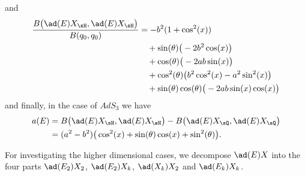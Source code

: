 and
\begin{equation}
	\begin{aligned}[]
		\frac{ B\big( \ad(E)X_{\sH},\ad(E)X_{\sH} \big)}{B(q_0,q_0)}&= -b^2(1+\cos^2(x))\\
							&\quad +\sin(\theta)\big( -2b^2\cos(x) \big)\\
							&\quad +\cos(\theta)\big( -2ab\sin(x) \big)\\
							&\quad +\cos^2(\theta)\big( b^2\cos^2(x)-a^2\sin^2(x) \big)\\
							&\quad +\sin(\theta)\cos(\theta)\big( -2ab\sin(x)\cos(x) \big)
	\end{aligned}
\end{equation}
and finally, in the case of $AdS_3$ we have
\begin{equation}		\label{LONGEqaEdansAdsTrois}
	\begin{aligned}[]
		a(E)&=B\big( \ad(E)X_{\sH},\ad(E)X_{\sH} \big)-B\big( \ad(E)X_{\sQ},\ad(E)X_{\sQ} \big)\\
			&=(a^2-b^2)\big( \cos^2(x)+\sin(\theta)\cos(x)+\sin^2(\theta) \big).
	\end{aligned}
\end{equation}

For investigating the higher dimensional cases, we decompose $\ad(E)X$ into the four parts $\ad(E_2)X_2$, $\ad(E_2)X_k$, $\ad(X_k)X_2$ and $\ad(E_k)X_k$. 

